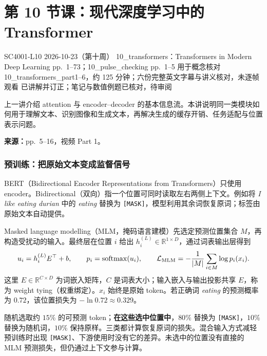 
\section{第 10 节课：现代深度学习中的 Transformer}
\label{lecture:SC4001-L10}

\lecturemeta
  {SC4001-L10}
  {2026-10-23（第十周）}
  {10\_transformers：Transformers in Modern Deep Learning}
  {pp.~1--73；10\_pulse\_checking pp.~1--5 用于概念核对}
  {10\_transformers\_part1--6，约 125 分钟；六份完整英文字幕与讲义核对，未逐帧观看}
  {已讲解并订正；笔记与数值例题已核对，待审阅}

上一讲介绍 attention 与 encoder--decoder 的基本信息流。本讲说明同一类模块如何用于理解文本、识别图像和生成文本，再解决生成的缓存开销、任务适配与位置表示问题。


\textbf{来源：}pp.~5--16，视频 Part 1。

\subsubsection{预训练：把原始文本变成监督信号}

BERT（Bidirectional Encoder Representations from Transformers）只使用 encoder。Bidirectional（双向）指一个位置可同时读取左右两侧上下文。例如将 \emph{I like eating durian} 中的 \emph{eating} 替换为 \texttt{[MASK]}，模型利用其余词恢复原词；标签由原始文本自动提供。

Masked language modelling（MLM，掩码语言建模）先选定预测位置集合 $M$，再构造受扰动的输入。最终层在位置 $i$ 给出 $h_i^{(L)}\in\mathbb R^{1\times D}$，通过词表输出层得到
\[
 u_i=h_i^{(L)}E^\top+b,\qquad p_i=\operatorname{softmax}(u_i),\qquad
 \mathcal L_{\rm MLM}=-\frac1{|M|}\sum_{i\in M}\log p_i(x_i).
\]
这里 $E\in\mathbb R^{C\times D}$ 为词嵌入矩阵，$C$ 是词表大小；输入嵌入与输出投影共享 $E$，称为 weight tying（权重绑定）。$x_i$ 始终是原始 token。若正确词 \emph{eating} 的预测概率为 $0.72$，该位置损失为 $-\ln0.72\approx0.329$。

随机选取约 $15\%$ 的可预测 token；\textbf{在这些选中位置中}，$80\%$ 替换为 \texttt{[MASK]}，$10\%$ 替换为随机词，$10\%$ 保持原样。三类都计算恢复原词的损失。混合输入方式减轻预训练时出现 \texttt{[MASK]}、下游使用时没有它的差异。未选中的位置没有直接的 MLM 预测损失，但仍通过上下文参与计算。

